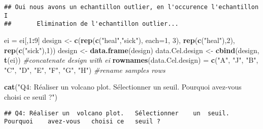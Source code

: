 \documentclass[]{article}
\newenvironment{Shaded}{\begin{snugshade}}{\end{snugshade}}
\newcommand{\KeywordTok}[1]{\textcolor[rgb]{0.13,0.29,0.53}{\textbf{#1}}}
\newcommand{\DataTypeTok}[1]{\textcolor[rgb]{0.13,0.29,0.53}{#1}}
\newcommand{\DecValTok}[1]{\textcolor[rgb]{0.00,0.00,0.81}{#1}}
\newcommand{\StringTok}[1]{\textcolor[rgb]{0.31,0.60,0.02}{#1}}
\newcommand{\CommentTok}[1]{\textcolor[rgb]{0.56,0.35,0.01}{\textit{#1}}}
\newcommand{\OperatorTok}[1]{\textcolor[rgb]{0.81,0.36,0.00}{\textbf{#1}}}
\newcommand{\NormalTok}[1]{#1}
\begin{document}
\begin{verbatim}
## Oui nous avons un echantillon outlier, en l'occurence l'echantillon I
##       Elimination de l'echantillon outlier...
\end{verbatim}

\begin{Shaded}
\begin{Highlighting}[]
\NormalTok{ei =}\StringTok{ }\NormalTok{ei[,}\DecValTok{1}\OperatorTok{:}\DecValTok{9}\NormalTok{]}
\NormalTok{design <-}\StringTok{ }\KeywordTok{c}\NormalTok{(}\KeywordTok{rep}\NormalTok{(}\KeywordTok{c}\NormalTok{(}\StringTok{"heal"}\NormalTok{,}\StringTok{"sick"}\NormalTok{), }\DataTypeTok{each=}\DecValTok{1}\NormalTok{, }\DecValTok{3}\NormalTok{), }\KeywordTok{rep}\NormalTok{(}\KeywordTok{c}\NormalTok{(}\StringTok{"heal"}\NormalTok{),}\DecValTok{2}\NormalTok{), }\KeywordTok{rep}\NormalTok{(}\KeywordTok{c}\NormalTok{(}\StringTok{"sick"}\NormalTok{),}\DecValTok{1}\NormalTok{))}
\NormalTok{design <-}\StringTok{ }\KeywordTok{data.frame}\NormalTok{(design)}
\NormalTok{data.Cel.design <-}\StringTok{ }\KeywordTok{cbind}\NormalTok{(design, }\KeywordTok{t}\NormalTok{(ei))  }\CommentTok{#concatenate design with ei}
\KeywordTok{rownames}\NormalTok{(data.Cel.design) =}\StringTok{ }\KeywordTok{c}\NormalTok{(}\StringTok{"A"}\NormalTok{, }\StringTok{"J"}\NormalTok{, }\StringTok{"B"}\NormalTok{, }\StringTok{"C"}\NormalTok{, }\StringTok{"D"}\NormalTok{, }\StringTok{"E"}\NormalTok{, }\StringTok{"F"}\NormalTok{, }\StringTok{"G"}\NormalTok{, }\StringTok{"H"}\NormalTok{)  }\CommentTok{#rename samples rows}


\KeywordTok{cat}\NormalTok{(}\StringTok{"Q4: Réaliser   un  volcano plot.   Sélectionner    un  seuil.  Pourquoi    avez-vous   choisi ce   seuil ?"}\NormalTok{)}
\end{Highlighting}
\end{Shaded}

\begin{verbatim}
## Q4: Réaliser un  volcano plot.   Sélectionner    un  seuil.  Pourquoi    avez-vous   choisi ce   seuil ?
\end{verbatim}
\end{document}

